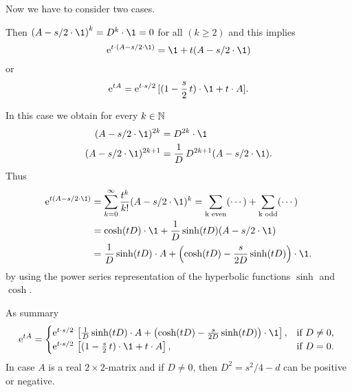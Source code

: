 Now we have to consider two cases.
\begin{description}[wide, labelindent=0em]

\item[$ D^{2} = 0 $: ] 
Then $\left( A - s/2 \cdot \1 \right)^{k} = D^{k} \cdot \1 = 0 $  for all $ (k \geq 2)$ and this implies 
%
\[
	  \mathrm{e}^{t \cdot \left( A - s/2 \cdot \1 \right)} = \1 + t( A - s/2 \cdot \1)
\]
%
or
%
\[
	 \mathrm{e}^{t A } =  \mathrm{e}^{t\cdot s/2} \, [ ( 1 - \frac{s}{2} \, t )\cdot \1 + t \cdot A] .
\]
%
\item[$ D^{2} \neq 0 $: ]
In this case we obtain for every $ k \in \mathbb{N} $
%
\begin{align*}
	( A - s/2 \cdot \1 )^{2k}  &= D^{2k} \cdot \1 \\ 
	( A - s/2 \cdot \1 )^{2k+1} &=\frac{1}{D} \, D^{2k+1}( A - s/2 \cdot \1) .
\end{align*}
Thus 
\begin{align*}
	 \mathrm{e}^{t( A - s/2 \cdot \1 )} 
		& = \sum_{k=0}^\infty \frac{t^k}{k!}( A - s/2 \cdot \1 )^k 
		= \sum_{ \text{k even} } (\cdots) + \sum_{ \text{k odd} } (\cdots)  \\
	&= \cosh( t D ) \cdot \1 + \frac{1}{D} \sinh( t D )( A - s/2 \cdot \1) \\
	&= \frac{ 1 }{ D } \sinh( tD )\cdot A + \left( \cosh(tD) - \frac{s}{2D} \sinh(tD) \right) \cdot \1.
\end{align*}
by using the power series representation of the hyperbolic functions $ \sinh $ and $ \cosh $.
\end{description}
As summary  
\begin{equation*}\label{eq:exp-rep}
	 \mathrm{e}^{tA} =
	\begin{cases}
		 \mathrm{e}^{t \cdot s/2} \, \left[ \frac{1}{D} \sinh(t D)  \cdot A + 
			\left( \cosh(tD) - \frac{s}{2D} \sinh(tD) \right) \cdot \1 \right], & 
									\text{if $ D \neq 0 $, } \\
		 \mathrm{e}^{t \cdot s/2} \, \left[ ( 1 - \frac{s}{2} \, t )\cdot \1 + t \cdot A \right], &
									\text{if $ D = 0 $.}
	\end{cases}
\end{equation*}
In case $A$ is a real $2 \times2$-matrix and if $ D \neq 0 $, then 
$ D^{2} = s^{2}/4 - d $ can be positive or negative. 
